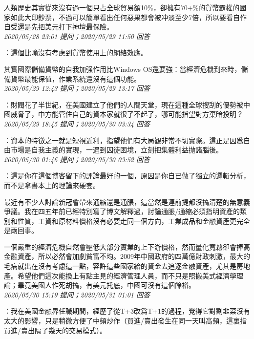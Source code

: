\documentclass[twocolumn]{ctexart}
\begin{document}
人類歷史其實從來沒有過一個只占全球貿易額10\%，卻擁有70+\%的貨幣霸權的國家如此大印鈔票，不過可以簡單看出任何惡果都會被冲淡至少7倍，所以要看自作自受還是先把美元打下神壇最保險。
\\

\textit{\hfill\noindent\small 2020/05/28 23:01 提问；2020/05/29 11:50 回答}

：這個比喻沒有考慮到貨幣使用上的網絡效應。

其實國際儲備貨幣的自我加强作用比Windows OS還要強：當經濟危機到來時，儲備貨幣最能保值，作業系統還沒有這個功能。
\\

\textit{\hfill\noindent\small 2020/05/29 12:43 提问；2020/05/29 13:17 回答}

：財閥花了半世紀，在美國建立了他們的人間天堂，現在這種全球搜刮的優勢被中國威脅了，中方能管住自己的資本家就很了不起了，哪可能指望對方棄暗投明？
\\

\textit{\hfill\noindent\small 2020/05/29 18:45 提问；2020/05/30 03:34 回答}

：資本的特徵之一就是短視近利，指望他們有大局觀非常不切實際。這正是因爲自由市場是自我主義的實現，一遇到囚徒困境，立刻把集體利益抛諸腦後。
\\

\textit{\hfill\noindent\small 2020/05/30 01:46 提问；2020/05/30 03:52 回答}

：這是你在這個博客留下的評論最好的一個，原因是你自已做了獨立的邏輯分析，而不是拿書本上的理論來硬套。

最近有不少人討論新冠會帶來通縮還是通脹，這當然是連前提都沒搞清楚的無意義爭議。我在四五年前已經特別寫了博文解釋過，討論通脹/通縮必須指明資產的類別和性質，工資和原材料價格沒有必要走同一個方向，工業成品和金融資產更完全是兩回事。

一個嚴重的經濟危機自然會壓低大部分實業的上下游價格，然而量化寬鬆卻會捧高金融資產，所以必然會加劇貧富不均。2009年中國政府的四萬億財政刺激，最大的毛病就出在沒有考慮這一點，容許這些國家給的資金去追逐金融資產，尤其是房地產。希望他們這次能換上有點主見的經濟管理人員，而不只是照搬美式經濟學理論；畢竟美國人作死胡搞，有美元托底，中國可沒有這個餘裕。
\\

\textit{\hfill\noindent\small 2020/05/30 15:19 提问；2020/05/31 01:01 回答}

：我在美國金融界任職期間，經歷了從T+3改爲T+1的過程，覺得它對割韭菜沒有太大的影響，只是稍微方便了中頻炒作（買進/賣出發生在同一天叫高頻，這裏指買進/賣出隔了幾天的交易模式）。
\end{document}

